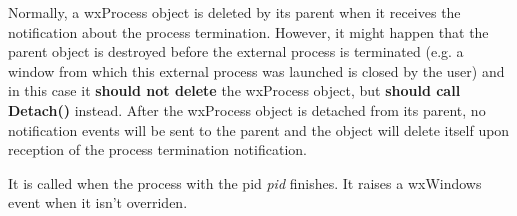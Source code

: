 \label{wxprocessdetach}


Normally, a wxProcess object is deleted by its parent when it receives the
notification about the process termination. However, it might happen that the
parent object is destroyed before the external process is terminated (e.g. a
window from which this external process was launched is closed by the user)
and in this case it {\bf should not delete} the wxProcess object, but 
{\bf should call Detach()} instead. After the wxProcess object is detached
from its parent, no notification events will be sent to the parent and the
object will delete itself upon reception of the process termination
notification.

\label{wxprocessonterminate}


It is called when the process with the pid {\it pid} finishes.
It raises a wxWindows event when it isn't overriden.



